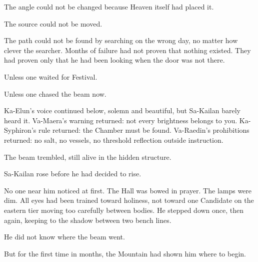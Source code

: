 The angle could not be changed because Heaven itself had placed it.\par

The source could not be moved.\par

The path could not be found by searching on the wrong day, no matter how clever the searcher. Months of failure had not proven that nothing existed. They had proven only that he had been looking when the door was not there.\par

Unless one waited for Festival.\par

Unless one chased the beam now.\par

Ka-Elun’s voice continued below, solemn and beautiful, but Sa-Kailan barely heard it. Va-Maera’s warning returned: not every brightness belongs to you. Ka-Syphiron’s rule returned: the Chamber must be found. Va-Raedin’s prohibitions returned: no salt, no vessels, no threshold reflection outside instruction.\par

The beam trembled, still alive in the hidden structure.\par

Sa-Kailan rose before he had decided to rise.\par

No one near him noticed at first. The Hall was bowed in prayer. The lamps were dim. All eyes had been trained toward holiness, not toward one Candidate on the eastern tier moving too carefully between bodies. He stepped down once, then again, keeping to the shadow between two bench lines.\par

He did not know where the beam went.\par

But for the first time in months, the Mountain had shown him where to begin.\par

\ornament
